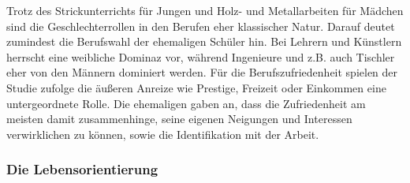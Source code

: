 Trotz des Strickunterrichts für Jungen und Holz- und Metallarbeiten für Mädchen sind die Geschlechterrollen in den Berufen eher klassischer Natur. Darauf deutet zumindest die Berufswahl der ehemaligen Schüler hin. Bei Lehrern und Künstlern herrscht eine weibliche Dominaz vor, während Ingenieure und z.B. auch Tischler eher von den Männern dominiert werden. Für die Berufszufriedenheit spielen der Studie zufolge die äußeren Anreize wie Prestige, Freizeit oder Einkommen eine untergeordnete Rolle. Die ehemaligen gaben an, dass die Zufriedenheit am meisten damit zusammenhinge, seine eigenen Neigungen und Interessen verwirklichen zu können, sowie die Identifikation mit der Arbeit. 

\subsubsection{Die Lebensorientierung}
\label{subsub:lebensorientierung}

